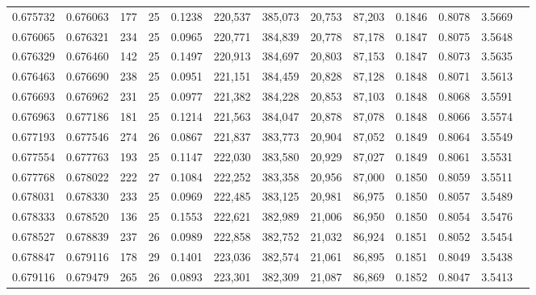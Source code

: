 \begin{tabular}{rrrrrrrrrrrrr}
0.675732 & 0.676063 &   177 &  25 &                                     0.1238 & 220,537 & 385,073 &  20,753 &  87,203 & 0.1846 & 0.8078 & 3.5669 \\
0.676065 & 0.676321 &   234 &  25 &                                     0.0965 & 220,771 & 384,839 &  20,778 &  87,178 & 0.1847 & 0.8075 & 3.5648 \\
0.676329 & 0.676460 &   142 &  25 &                                     0.1497 & 220,913 & 384,697 &  20,803 &  87,153 & 0.1847 & 0.8073 & 3.5635 \\
0.676463 & 0.676690 &   238 &  25 &                                     0.0951 & 221,151 & 384,459 &  20,828 &  87,128 & 0.1848 & 0.8071 & 3.5613 \\
0.676693 & 0.676962 &   231 &  25 &                                     0.0977 & 221,382 & 384,228 &  20,853 &  87,103 & 0.1848 & 0.8068 & 3.5591 \\
0.676963 & 0.677186 &   181 &  25 &                                     0.1214 & 221,563 & 384,047 &  20,878 &  87,078 & 0.1848 & 0.8066 & 3.5574 \\
0.677193 & 0.677546 &   274 &  26 &                                     0.0867 & 221,837 & 383,773 &  20,904 &  87,052 & 0.1849 & 0.8064 & 3.5549 \\
0.677554 & 0.677763 &   193 &  25 &                                     0.1147 & 222,030 & 383,580 &  20,929 &  87,027 & 0.1849 & 0.8061 & 3.5531 \\
0.677768 & 0.678022 &   222 &  27 &                                     0.1084 & 222,252 & 383,358 &  20,956 &  87,000 & 0.1850 & 0.8059 & 3.5511 \\
0.678031 & 0.678330 &   233 &  25 &                                     0.0969 & 222,485 & 383,125 &  20,981 &  86,975 & 0.1850 & 0.8057 & 3.5489 \\
0.678333 & 0.678520 &   136 &  25 &                                     0.1553 & 222,621 & 382,989 &  21,006 &  86,950 & 0.1850 & 0.8054 & 3.5476 \\
0.678527 & 0.678839 &   237 &  26 &                                     0.0989 & 222,858 & 382,752 &  21,032 &  86,924 & 0.1851 & 0.8052 & 3.5454 \\
0.678847 & 0.679116 &   178 &  29 &                                     0.1401 & 223,036 & 382,574 &  21,061 &  86,895 & 0.1851 & 0.8049 & 3.5438 \\
0.679116 & 0.679479 &   265 &  26 &                                     0.0893 & 223,301 & 382,309 &  21,087 &  86,869 & 0.1852 & 0.8047 & 3.5413 \\

\end{tabular}
